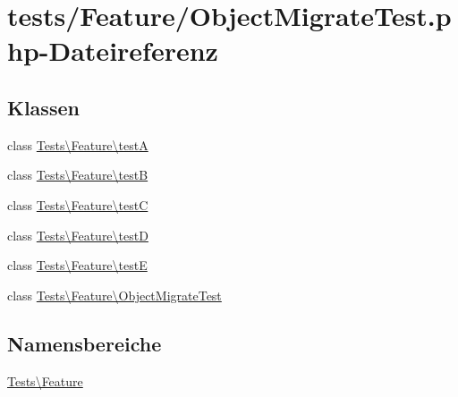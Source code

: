 \hypertarget{ObjectMigrateTest_8php}{}\section{tests/\+Feature/\+Object\+Migrate\+Test.php-\/\+Dateireferenz}
\label{ObjectMigrateTest_8php}
\subsection*{Klassen}
\begin{DoxyCompactItemize}
\item 
class \hyperlink{classTests_1_1Feature_1_1testA}{Tests\textbackslash{}\+Feature\textbackslash{}testA}
\item 
class \hyperlink{classTests_1_1Feature_1_1testB}{Tests\textbackslash{}\+Feature\textbackslash{}testB}
\item 
class \hyperlink{classTests_1_1Feature_1_1testC}{Tests\textbackslash{}\+Feature\textbackslash{}testC}
\item 
class \hyperlink{classTests_1_1Feature_1_1testD}{Tests\textbackslash{}\+Feature\textbackslash{}testD}
\item 
class \hyperlink{classTests_1_1Feature_1_1testE}{Tests\textbackslash{}\+Feature\textbackslash{}testE}
\item 
class \hyperlink{classTests_1_1Feature_1_1ObjectMigrateTest}{Tests\textbackslash{}\+Feature\textbackslash{}\+Object\+Migrate\+Test}
\end{DoxyCompactItemize}
\subsection*{Namensbereiche}
\begin{DoxyCompactItemize}
\item 
 \hyperlink{namespaceTests_1_1Feature}{Tests\textbackslash{}\+Feature}
\end{DoxyCompactItemize}
